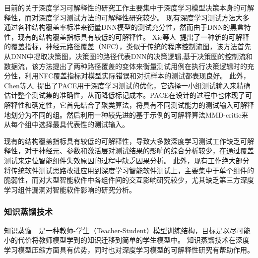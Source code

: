 目前的关于深度学习可解释性的研究工作主要集中于深度学习模型决策本身的可解释性，而对深度学习测试方法的可解释性研究较少。
现有深度学习测试方法大多通过各种结构覆盖率标准来衡量DNN模型的测试充分性，然而由于DNN的黑盒特性，现有的结构覆盖指标具有较低的可解释性。
Xie等人~提出了一种新的可解释的覆盖指标，神经元路径覆盖（NFC），类似于传统的程序控制流图，该方法首先从DNN中提取决策图，决策图的路径代表DNN的决策逻辑,基于决策图的控制流和数据流，该方法提出了两种路径覆盖的变体来衡量测试用例在执行决策逻辑时的充分性，利用NFC覆盖指标对模型实际错误和对抗样本的测试都表现良好。
此外，Chen等人~提出了PACE用于深度学习测试的优化，它选择一小组测试输入来精确估计整个测试集的准确性，从而降低标记成本。PACE在设计的过程中也体现了可解释性和确定性，它首先结合了聚类算法，将具有不同测试能力的测试输入可解释地划分为不同的组。然后利用一种较先进的基于示例的可解释算法MMD-critic来从每个组中选择最具代表性的测试输入。

现有的结构覆盖指标具有较低的可解释性，导致大多数深度学习测试工作缺乏可解释性，对于神经元、参数和激活层对测试结果的影响的综合分析较少，在通过覆盖测试来定位智能组件失效原因的过程中缺乏因果分析。
此外，现有工作绝大部分将传统软件测试思路改进应用到深度学习智能软件测试上，主要集中于单个组件的脆弱性，而对大型智能软件中各组件间的交互影响研究较少，尤其缺乏第三方深度学习组件漏洞对智能软件影响的研究分析。










\subsubsection{知识蒸馏技术}

知识蒸馏~~是一种教师-学生（Teacher-Student）模型训练结构，目标是以尽可能小的代价将教师模型学到的知识迁移到简单的学生模型中。
知识蒸馏技术在深度学习模型压缩方面具有优势，同时也对深度学习模型的可解释性研究有帮助作用。

